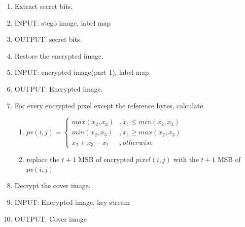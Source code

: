 \documentclass{article}
\begin{document}
\begin{enumerate}
	\item Extract secret bits.
	\item[] INPUT: stego image, label map
	\item[] OUTPUT: secret bits.
	      
	\item Restore the encrypted image.
	\item[] INPUT: encrypted image(part 1), label map
	\item[] OUTPUT: Encrypted image.
	\item[] For every encrypted pixel except the reference bytes, calculate
	      \begin{enumerate}
		      \item 
		            $pv(i, j) = \left\{
			            \begin{array}{rl}
				            max(x_2, x_3)   & , x_1 \leq min(x_2, x_3) \\
				            min(x_2, x_3)   & , x_1 \geq max(x_2, x_3) \\
				            x_2 + x_3 - x_1 & , otherwise
			            \end{array} \right. $
		      \item replace the $t+1$ MSB of encrypted $pixel(i, j)$ with the $t+1$ MSB of $pv(i, j)$
	      \end{enumerate}
	      
	\item Decrypt the cover image.
	\item[] INPUT: Encrypted image, key stream
	\item[] OUTPUT: Cover image
	      
\end{enumerate}
\end{document}
